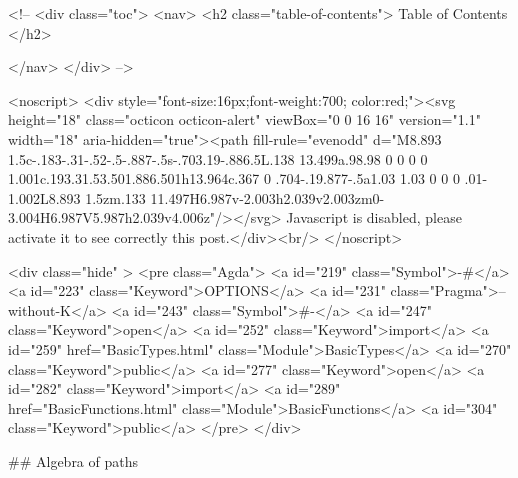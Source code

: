   <!-- 
  <div class="toc">
    <nav>
    <h2 class="table-of-contents"> Table of Contents </h2>
      

    </nav>
  </div>
   -->

  <noscript>
  <div style="font-size:16px;font-weight:700; color:red;"><svg height="18" class="octicon octicon-alert" viewBox="0 0 16 16" version="1.1" width="18" aria-hidden="true"><path fill-rule="evenodd" d="M8.893 1.5c-.183-.31-.52-.5-.887-.5s-.703.19-.886.5L.138 13.499a.98.98 0 0 0 0 1.001c.193.31.53.501.886.501h13.964c.367 0 .704-.19.877-.5a1.03 1.03 0 0 0 .01-1.002L8.893 1.5zm.133 11.497H6.987v-2.003h2.039v2.003zm0-3.004H6.987V5.987h2.039v4.006z"/></svg> Javascript is disabled, please activate it to see correctly this post.</div><br/>
  </noscript>

  <div class="hide" >
<pre class="Agda">
<a id="219" class="Symbol">{-#</a> <a id="223" class="Keyword">OPTIONS</a> <a id="231" class="Pragma">--without-K</a> <a id="243" class="Symbol">#-}</a>
<a id="247" class="Keyword">open</a> <a id="252" class="Keyword">import</a> <a id="259" href="BasicTypes.html" class="Module">BasicTypes</a> <a id="270" class="Keyword">public</a>
<a id="277" class="Keyword">open</a> <a id="282" class="Keyword">import</a> <a id="289" href="BasicFunctions.html" class="Module">BasicFunctions</a> <a id="304" class="Keyword">public</a>
</pre>
</div>

## Algebra of paths


